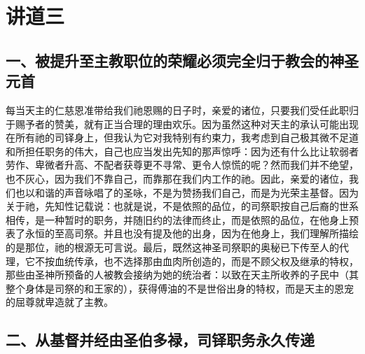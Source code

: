 

\section{讲道三}

\par


\subsection{一、被提升至主教职位的荣耀必须完全归于教会的神圣元首}

每当天主的仁慈恩准带给我们祂恩赐的日子时，亲爱的诸位，只要我们受任此职归于赐予者的赞美，就有正当合理的理由欢乐。因为虽然这种对天主的承认可能出现在所有祂的司铎身上，但我认为它对我特别有约束力，我考虑到自己极其微不足道和所担任职务的伟大，自己也应当发出先知的那声惊呼：因为还有什么比让软弱者劳作、卑微者升高、不配者获尊更不寻常、更令人惊慌的呢？然而我们并不绝望，也不灰心，因为我们不靠自己，而靠那在我们内工作的祂。因此，亲爱的诸位，我们也以和谐的声音咏唱了的圣咏，不是为赞扬我们自己，而是为光荣主基督。因为关于祂，先知性记载说：也就是说，不是依照的品位，的司祭职按自己后裔的世系相传，是一种暂时的职务，并随旧约的法律而终止，而是依照的品位，在他身上预表了永恒的至高司祭。并且也没有提及他的出身，因为在他身上，我们理解所描绘的是那位，祂的根源无可言说。最后，既然这神圣司祭职的奥秘已下传至人的代理，它不按血统传承，也不选择那由血肉所创造的，而是不顾父权及继承的特权，那些由圣神所预备的人被教会接纳为她的统治者：以致在天主所收养的子民中（其整个身体是司祭的和王家的），获得傅油的不是世俗出身的特权，而是天主的恩宠的屈尊就卑造就了主教。\par


\subsection{二、从基督并经由圣伯多禄，司铎职务永久传递}

